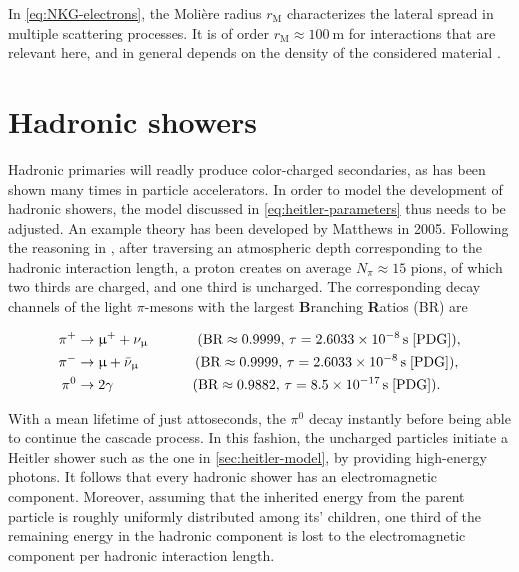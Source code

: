 In \autoref{eq:NKG-electrons}, the Molière radius $r_\text{M}$ characterizes the lateral spread in multiple scattering processes. It is of order 
$r_\text{M}\approx\SI{100}{\meter}$ for interactions that are relevant here, and in general depends on the density of the considered material 
\cite{moliere1947theorie}.

\section{Hadronic showers}
\label{sec:heitler-matthews-model}

Hadronic primaries will readly produce color-charged secondaries, as has been shown many times in particle accelerators. In order to model the development of 
hadronic showers, the model discussed in \autoref{eq:heitler-parameters} thus needs to be adjusted. An example theory has been developed by Matthews in 2005. 
Following the reasoning in \cite{matthews2005heitler}, after traversing an atmospheric depth corresponding to the hadronic interaction length, a proton creates on 
average $N_\pi \approx 15$ pions, of which two thirds are charged, and one third is uncharged. The corresponding decay channels of the light $\pi$-mesons with the 
largest \textbf{B}ranching \textbf{R}atios (BR) are 

\begin{align*}
	\pi^{+} &\rightarrow \upmu^{+} + \nu_\upmu \!\!\!  \qquad\qquad (\text{BR}\approx0.9999,\,\tau=\SI{2.6033e-8}{\second} \; \text{\cite{PDG}}), \\
	\pi^{-} &\rightarrow \upmu + \bar{\nu}_\upmu \qquad\qquad (\text{BR}\approx0.9999,\,\tau=\SI{2.6033e-8}{\second} \; \text{\cite{PDG}}), \\
	\pi^0 &\rightarrow 2\gamma \!\! \qquad\qquad\qquad (\text{BR}\approx0.9882,\,\tau=\SI{8.5e-17}{\second}\; \text{\cite{PDG}}).
\end{align*}

With a mean lifetime of just attoseconds, the $\pi^0$ decay instantly before being able to continue the cascade process. In this fashion, the uncharged particles 
initiate a Heitler shower such as the one in \autoref{sec:heitler-model}, by providing high-energy photons. It follows that every hadronic shower has an 
electromagnetic component. Moreover, assuming that the inherited energy from the parent particle is roughly uniformly distributed among its' children, one third of
the remaining energy in the hadronic component is lost to the electromagnetic component per hadronic interaction length. 

